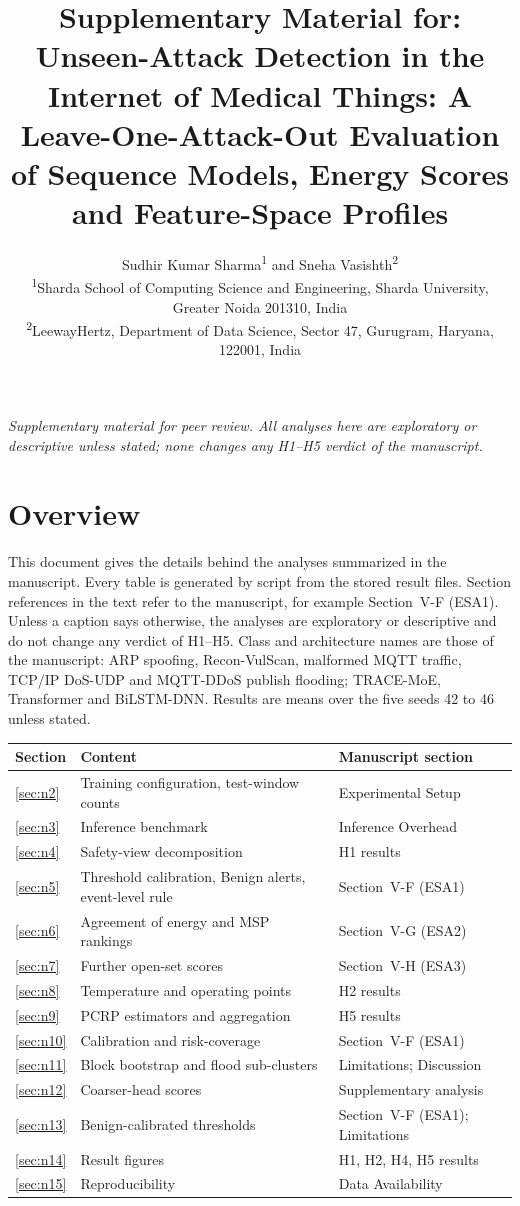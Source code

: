 \documentclass[10pt,a4paper]{article}
\title{Supplementary Material for: Unseen-Attack Detection in the Internet of Medical Things: A Leave-One-Attack-Out Evaluation of Sequence Models, Energy Scores and Feature-Space Profiles}
\author{Sudhir Kumar Sharma\textsuperscript{1} and Sneha Vasishth\textsuperscript{2}\\[4pt]
{\small \textsuperscript{1}Sharda School of Computing Science and Engineering, Sharda University, Greater Noida 201310, India}\\
{\small \textsuperscript{2}LeewayHertz, Department of Data Science, Sector 47, Gurugram, Haryana, 122001, India}}
\date{}
\begin{document}
\maketitle
\begin{center}\itshape Supplementary material for peer review. All analyses here are exploratory or descriptive unless stated; none changes any H1--H5 verdict of the manuscript.\end{center}
\tableofcontents
\clearpage
\section{Overview}\label{sec:n1}
This document gives the details behind the analyses summarized in the manuscript. Every table is generated by script from the stored result files. Section references in the text refer to the manuscript, for example Section~V-F (ESA1).
Unless a caption says otherwise, the analyses are exploratory or descriptive and do not change any verdict of H1--H5. Class and architecture names are those of the manuscript: ARP spoofing, Recon-VulScan, malformed MQTT traffic, TCP/IP DoS-UDP and MQTT-DDoS publish flooding; TRACE-MoE, Transformer and BiLSTM-DNN. Results are means over the five seeds 42 to 46 unless stated.
\begin{center}\small\begin{tabular}{@{}lll@{}}\toprule Section & Content & Manuscript section\\ \midrule
\ref{sec:n2} & Training configuration, test-window counts & Experimental Setup\\
\ref{sec:n3} & Inference benchmark & Inference Overhead\\
\ref{sec:n4} & Safety-view decomposition & H1 results\\
\ref{sec:n5} & Threshold calibration, Benign alerts, event-level rule & Section~V-F (ESA1)\\
\ref{sec:n6} & Agreement of energy and MSP rankings & Section~V-G (ESA2)\\
\ref{sec:n7} & Further open-set scores & Section~V-H (ESA3)\\
\ref{sec:n8} & Temperature and operating points & H2 results\\
\ref{sec:n9} & PCRP estimators and aggregation & H5 results\\
\ref{sec:n10} & Calibration and risk-coverage & Section~V-F (ESA1)\\
\ref{sec:n11} & Block bootstrap and flood sub-clusters & Limitations; Discussion\\
\ref{sec:n12} & Coarser-head scores & Supplementary analysis\\
\ref{sec:n13} & Benign-calibrated thresholds & Section~V-F (ESA1); Limitations\\
\ref{sec:n14} & Result figures & H1, H2, H4, H5 results\\
\ref{sec:n15} & Reproducibility & Data Availability\\ \bottomrule\end{tabular}\end{center}
\end{document}
